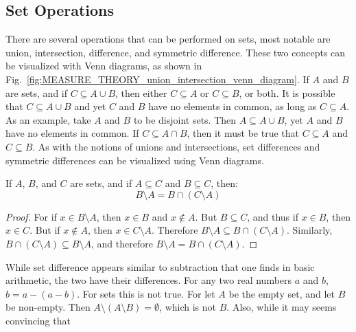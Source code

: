     \subsection{Set Operations}
        There are several operations that can be performed on sets,
        most notable are union, intersection, difference, and symmetric
        difference.
        These two concepts can be visualized with Venn diagrams, as shown in
        Fig.~\ref{fig:MEASURE_THEORY_union_intersection_venn_diagram}.
        If $A$ and $B$ are sets, and if $C\subseteq{A}\cup{B}$, then
        either $C\subseteq{A}$ or $C\subseteq{B}$, or both. It is
        possible that $C\subseteq{A}\cup{B}$ and yet $C$ and $B$ have no
        elements in common, as long as $C\subseteq{A}$. As an example,
        take $A$ and $B$ to be disjoint sets. Then $A\subseteq{A}\cup{B}$,
        yet $A$ and $B$ have no elements in common. If
        $C\subseteq{A}\cap{B}$, then it must be true that
        $C\subseteq{A}$ and $C\subseteq{B}$.
        As with the notions of unions and intersections, set differences and
        symmetric differences can be visualized using Venn diagrams.
        \begin{theorem}
            \label{thm:MEASURE_THEORY_SET_DIFFERENCE_AS_INTERSECTION}
            If $A$, $B$, and $C$ are sets, and if $A\subseteq{C}$
            and $B\subseteq{C}$, then:
            \begin{equation}
                B\setminus{A}=B\cap(C\setminus{A})
            \end{equation}
        \end{theorem}
        \begin{proof}
            For if $x\in{B}\setminus{A}$, then
            $x\in{B}$ and $x\notin{A}$. But
            $B\subseteq{C}$, and thus if $x\in{B}$, then $x\in{C}$.
            But if $x\notin{A}$, then $x\in{C}\setminus{A}$. Therefore
            $B\setminus{A}\subseteq{B}\cap(C\setminus{A})$.
            Similarly, $B\cap(C\setminus{A})\subseteq{B}\setminus{A}$,
            and therefore $B\setminus{A}={B}\cap(C\setminus{A})$.
        \end{proof}
        While set difference appears similar to subtraction that one finds in
        basic arithmetic, the two have their differences. For any two real
        numbers $a$ and $b$, $b=a-(a-b)$. For sets this is not true. For let
        $A$ be the empty set, and let $B$ be non-empty. Then
        $A\setminus(A\setminus{B})=\emptyset$, which is not $B$.
        Also, while it may seems convincing that
